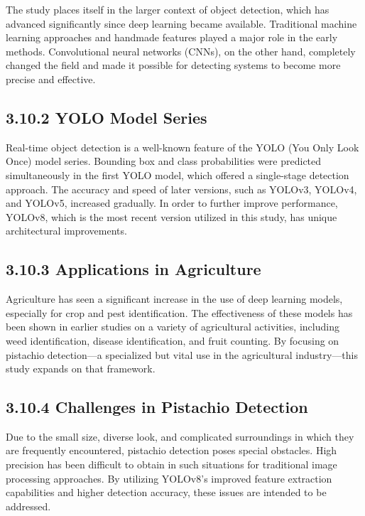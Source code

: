\documentclass{book} %
\begin{document}
\noindent The study places itself in the larger context of object detection, which has advanced significantly since deep learning became available. Traditional machine learning approaches and handmade features played a major role in the early methods. Convolutional neural networks (CNNs), on the other hand, completely changed the field and made it possible for detecting systems to become more precise and effective.

\noindent 
\subsection{3.10.2 YOLO Model Series }

\noindent Real-time object detection is a well-known feature of the YOLO (You Only Look Once) model series. Bounding box and class probabilities were predicted simultaneously in the first YOLO model, which offered a single-stage detection approach. The accuracy and speed of later versions, such as YOLOv3, YOLOv4, and YOLOv5, increased gradually. In order to further improve performance, YOLOv8, which is the most recent version utilized in this study, has unique architectural improvements.\textbf{}

\noindent 
\subsection{3.10.3 Applications in Agriculture }

\noindent Agriculture has seen a significant increase in the use of deep learning models, especially for crop and pest identification. The effectiveness of these models has been shown in earlier studies on a variety of agricultural activities, including weed identification, disease identification, and fruit counting. By focusing on pistachio detection---a specialized but vital use in the agricultural industry---this study expands on that framework.

\noindent 
\subsection{3.10.4 Challenges in Pistachio Detection }

\noindent Due to the small size, diverse look, and complicated surroundings in which they are frequently encountered, pistachio detection poses special obstacles. High precision has been difficult to obtain in such situations for traditional image processing approaches. By utilizing YOLOv8's improved feature extraction capabilities and higher detection accuracy, these issues are intended to be addressed.
\end{document}
